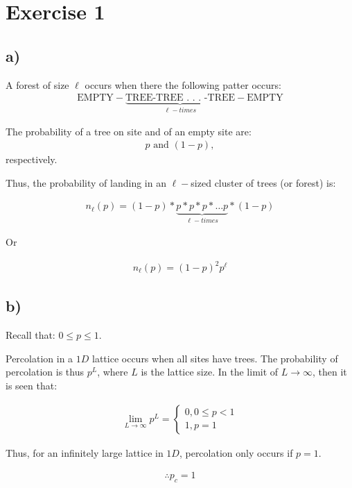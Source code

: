 \documentclass{article}
\begin{document}
\section{Exercise 1}
\subsection{a)}
A forest of size $\ell$ occurs when there the following patter occurs:
\begin{align}
\text{EMPTY}-\underbrace{\text{TREE-TREE . . . -TREE}}_{\ell-times}-\text{EMPTY}
\end{align}

The probability of a tree on site and of an empty site are:
\begin{align}
p \text{ and } (1-p),
\end{align}
respectively.

Thus, the probability of landing in an $\ell-$sized cluster of trees (or forest) is:

\begin{align}
n_{\ell}(p) = (1-p) * \underbrace{p * p * p * \dots p}_{\ell-times} * (1-p)
\end{align}

Or

\begin{align}
n_{\ell}(p) = (1-p)^2 p^{\ell}
\end{align}

\subsection{b)}

Recall that: $0 \leq p \leq 1$.

Percolation in a $1D$ lattice occurs when all sites have trees. The probability of percolation is thus $p^L$, where $L$ is the lattice size. In the limit of $L\to\infty$, then it is seen that:

\begin{align}
\lim_{L\to\infty} p^L = \begin{cases} 0 , 0\leq p < 1 \\1 , p=1 \end{cases}
\end{align}

Thus, for an infinitely large lattice in $1D$, percolation only occurs if $p=1$.

\begin{align}
\therefore p_c = 1
\end{align}
\end{document}
